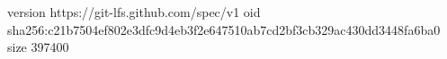 version https://git-lfs.github.com/spec/v1
oid sha256:c21b7504ef802e3dfc9d4eb3f2e647510ab7cd2bf3cb329ac430dd3448fa6ba0
size 397400
